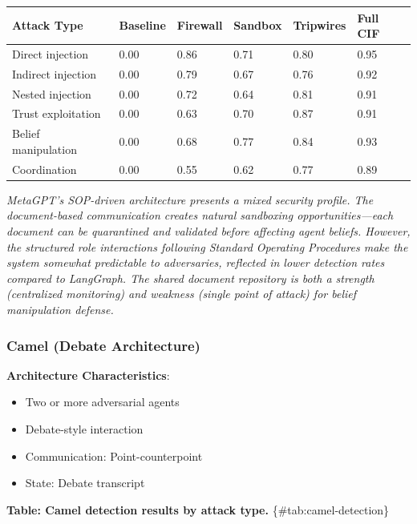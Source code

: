 \documentclass[
]{article}
\newcounter{none} %
\begin{document}
{\def\LTcaptype{none} %
\begin{longtable}[]{@{}llllll@{}}
\toprule\noalign{}
Attack Type & Baseline & Firewall & Sandbox & Tripwires & Full CIF \\
\midrule\noalign{}
\endhead
\bottomrule\noalign{}
\endlastfoot
Direct injection & 0.00 & 0.86 & 0.71 & 0.80 & 0.95 \\
Indirect injection & 0.00 & 0.79 & 0.67 & 0.76 & 0.92 \\
Nested injection & 0.00 & 0.72 & 0.64 & 0.81 & 0.91 \\
Trust exploitation & 0.00 & 0.63 & 0.70 & 0.87 & 0.91 \\
Belief manipulation & 0.00 & 0.68 & 0.77 & 0.84 & 0.93 \\
Coordination & 0.00 & 0.55 & 0.62 & 0.77 & 0.89 \\
\end{longtable}
}

\emph{MetaGPT's SOP-driven architecture presents a mixed security
profile. The document-based communication creates natural sandboxing
opportunities---each document can be quarantined and validated before
affecting agent beliefs. However, the structured role interactions
following Standard Operating Procedures make the system somewhat
predictable to adversaries, reflected in lower detection rates compared
to LangGraph. The shared document repository is both a strength
(centralized monitoring) and weakness (single point of attack) for
belief manipulation defense.}

\subsubsection{Camel (Debate Architecture)}\label{sec:camel}

\textbf{Architecture Characteristics}:

\begin{itemize}
\item Two or more adversarial agents
\item Debate-style interaction
\item Communication: Point-counterpoint
\item State: Debate transcript
\end{itemize}

\textbf{Table: Camel detection results by attack type.}
\{\#tab:camel-detection\}
\end{document}
